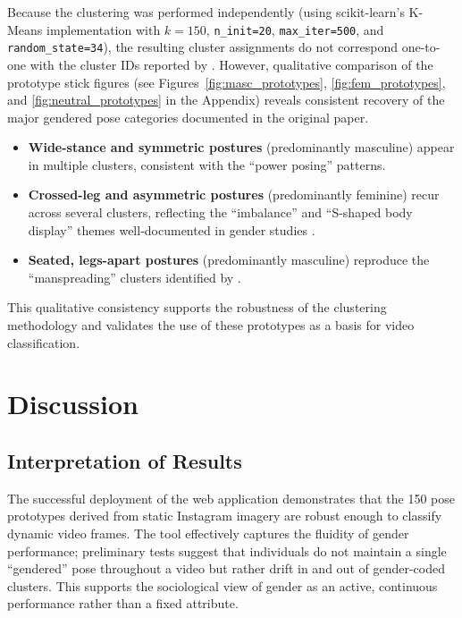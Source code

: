 \documentclass[12pt, a4paper]{article}
\begin{document}
Because the clustering was performed independently (using scikit-learn's K-Means implementation with $k = 150$, \texttt{n\_init=20}, \texttt{max\_iter=500}, and \texttt{random\_state=34}), the resulting cluster assignments do not correspond one-to-one with the cluster IDs reported by \citet{tsolak2025unveiling}. However, qualitative comparison of the prototype stick figures (see Figures~\ref{fig:masc_prototypes}, \ref{fig:fem_prototypes}, and \ref{fig:neutral_prototypes} in the Appendix) reveals consistent recovery of the major gendered pose categories documented in the original paper.

\begin{itemize}[nosep]
    \item \textbf{Wide-stance and symmetric postures} (predominantly masculine) appear in multiple clusters, consistent with the ``power posing'' patterns.
    \item \textbf{Crossed-leg and asymmetric postures} (predominantly feminine) recur across several clusters, reflecting the ``imbalance'' and ``S-shaped body display'' themes well-documented in gender studies \citep{doring2016selfies}.
    \item \textbf{Seated, legs-apart postures} (predominantly masculine) reproduce the ``manspreading'' clusters identified by \citet{tsolak2025unveiling}.
\end{itemize}

\noindent This qualitative consistency supports the robustness of the clustering methodology and validates the use of these prototypes as a basis for video classification.



\section{Discussion}
\label{sec:discussion}

\subsection{Interpretation of Results}
\label{sec:interpretation}

The successful deployment of the web application demonstrates that the 150 pose prototypes derived from static Instagram imagery are robust enough to classify dynamic video frames. The tool effectively captures the fluidity of gender performance; preliminary tests suggest that individuals do not maintain a single ``gendered'' pose throughout a video but rather drift in and out of gender-coded clusters. This supports the sociological view of gender as an active, continuous performance rather than a fixed attribute.
\end{document}
